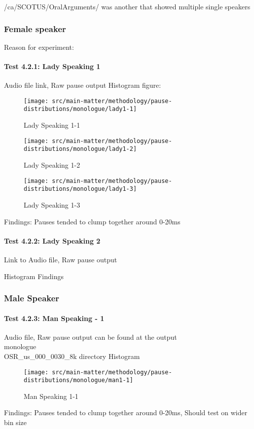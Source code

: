 /ca/SCOTUS/OralArguments/ was another that showed multiple single speakers

\subsubsection{Female speaker}
Reason for experiment: 
\paragraph{Test 4.2.1: Lady Speaking 1}
    
Audio file link, Raw pause output
Histogram figure: 

\begin{figure}[h]
    \centering
    \begin{minipage}{0.45\textwidth}
        \centering
        \texttt{[image: src/main-matter/methodology/pause-distributions/monologue/lady1-1]} 
        \caption{Lady Speaking 1-1}
    \end{minipage}\hfill
    \begin{minipage}{0.45\textwidth}
        \centering
        \texttt{[image: src/main-matter/methodology/pause-distributions/monologue/lady1-2]} 
        \caption{Lady Speaking 1-2}
    \end{minipage}\hfill
    \begin{minipage}{0.45\textwidth}
        \centering
        \texttt{[image: src/main-matter/methodology/pause-distributions/monologue/lady1-3]} 
        \caption{Lady Speaking 1-3}
    \end{minipage}
\end{figure}

Findings: Pauses tended to clump together around 0-20ms

\paragraph{Test 4.2.2: Lady Speaking 2}
Link to Audio file, Raw pause output

Histogram
Findings
        
        
        
\subsubsection{Male Speaker}
\paragraph{Test 4.2.3: Man Speaking - 1}
Audio file, Raw pause output can be found at the output\\monologue\\OSR\_us\_000\_0030\_8k directory
Histogram 
\begin{figure}[h]
	\begin{center}
		\texttt{[image: src/main-matter/methodology/pause-distributions/monologue/man1-1]}
		\caption{Man Speaking 1-1}
		\label{default}
	\end{center}
\end{figure}
Findings: Pauses tended to clump together around 0-20ms, Should test on wider bin size

